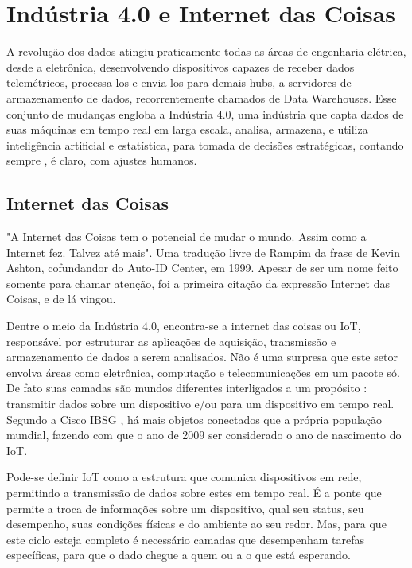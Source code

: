 \chapter{Indústria 4.0 e Internet das Coisas}
\label{chapter:industria_4_0_iot}

A revolução dos dados atingiu praticamente todas as áreas de engenharia elétrica, desde a eletrônica, desenvolvendo dispositivos capazes de receber dados telemétricos, processa-los e envia-los para demais hubs, a servidores de armazenamento de dados, recorrentemente chamados de Data Warehouses. Esse conjunto de mudanças engloba a Indústria 4.0, uma indústria que capta dados de suas máquinas em tempo real em larga escala, analisa, armazena, e utiliza inteligência artificial e estatística, para tomada de decisões estratégicas, contando sempre , é claro, com ajustes humanos.

\section{Internet das Coisas}
\label{section:iot}

"A Internet das Coisas tem o potencial de mudar o mundo. Assim como a Internet fez. Talvez até mais"\cite{ashton:iot}. Uma tradução livre de Rampim \cite{Rampim:iot} da frase de Kevin Ashton, cofundandor do Auto-ID Center, em 1999. Apesar de ser um nome feito somente para chamar atenção, foi a primeira citação da expressão Internet das Coisas, e de lá vingou.

Dentre o meio da Indústria 4.0, encontra-se a internet das coisas ou IoT, responsável por estruturar as aplicações de aquisição, transmissão e armazenamento de dados a serem analisados. Não é uma surpresa que este setor envolva áreas como eletrônica, computação e telecomunicações em um pacote só. De fato suas camadas são mundos diferentes interligados a um propósito : transmitir dados sobre um dispositivo e/ou para um dispositivo em tempo real. Segundo a Cisco IBSG \cite{cisco:ibsg}, há mais objetos conectados que a própria população mundial, fazendo com que o ano de 2009 ser considerado o ano de nascimento do IoT.

Pode-se definir IoT como a estrutura que comunica dispositivos em rede, permitindo a transmissão de dados sobre estes em tempo real. É a ponte que permite a troca de informações sobre um dispositivo, qual seu status, seu desempenho, suas condições físicas e do ambiente ao seu redor. Mas, para que este ciclo esteja completo é necessário camadas que desempenham tarefas específicas, para que o dado chegue a quem ou a o que está esperando.

